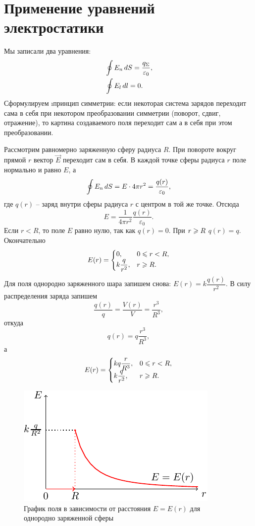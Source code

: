 \section{Применение уравнений электростатики}

	Мы записали два уравнения:
	\begin{eqnarray}
		& \oint E_n \,d S=\dfrac{q_{\Sigma}}{\varepsilon_0}, \\
		& \oint E_l \,d l=0.
	\end{eqnarray}
	Сформулируем \i{принцип симметрии}: если некоторая система зарядов переходит сама в себя при некотором преобразовании симметрии (поворот, сдвиг, отражение), то картина создаваемого поля переходит сам а в себя при этом преобразовании. \par

	Рассмотрим равномерно заряженную сферу  радиуса $R$. При повороте вокруг прямой $r$ вектор $\vec{E}$ переходит сам в себя. В каждой точке сферы радиуса $r$ поле  нормально и равно $E$, а 
	\begin{equation}
		\oint E_n \,d S=E\cdot 4\pi r^2=\frac{q(r)}{\varepsilon_0},
	\end{equation}
	где $q(r)$ -- заряд внутри сферы радиуса $r$ с центром в той же точке. Отсюда
	\begin{equation}
		E=\frac{1}{4\pi r^2}\frac{q(r)}{\varepsilon_0}.
	\end{equation}
	Если $r<R$, то поле $E$ равно нулю, так как $q(r)=0$. При $r\geqslant R$ $q(r)=q$. Окончательно
	\begin{equation}
		E(r)=	\begin{cases}
					0,& \text{$0\leqslant r<R$},\\
					k\dfrac{q}{r^2},& \text{$r\geqslant R$}.
				\end{cases}
	\end{equation}
	Для поля однородно заряженного шара запишем снова: $E(r)=k\dfrac{q(r)}{r^2}$. В силу распределения заряда запишем
		$$\dfrac{q(r)}{q}=\frac{V(r)}{V}=\frac{r^3}{R^3},$$
	откуда
		$$q(r)=q\frac{r^3}{R^3},$$
	а
	\begin{equation}
		E(r)=	\begin{cases}
					kq\dfrac{r}{R^3},& \text{$0\leqslant r<R$},\\
					k\dfrac{q}{r^2},& \text{$r\geqslant R$}.
				\end{cases}
	\end{equation}
	\begin{figure}[t]
		\centering
		\includegraphics[scale=2]{./img/plot1/plot1.pdf}
		\caption{График поля в зависимости от расстояния $E=E(r)$ для однородно заряженной сферы}
	\end{figure}
